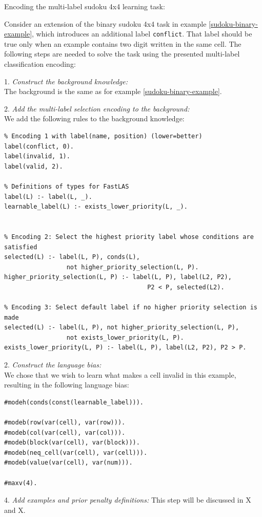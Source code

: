 \begin{example}
Encoding the multi-label sudoku 4x4 learning task:

Consider an extension of the binary sudoku 4x4 task in example \ref{sudoku-binary-example}, which introduces an additional label \verb_conflict_. 
That label should be true only when an example contains two digit written in the same cell.
The following steps are needed to solve the task using the presented multi-label classification encoding:

1. \textit{Construct the background knowledge:} \\
The background is the same as for example \ref{sudoku-binary-example}.

2. \textit{Add the multi-label selection encoding to the background:} \\
We add the following rules to the background knowledge:
\begin{lstlisting}
% Encoding 1 with label(name, position) (lower=better)
label(conflict, 0).
label(invalid, 1).
label(valid, 2).

% Definitions of types for FastLAS
label(L) :- label(L, _).
learnable_label(L) :- exists_lower_priority(L, _).


% Encoding 2: Select the highest priority label whose conditions are satisfied
selected(L) :- label(L, P), conds(L), 
                 not higher_priority_selection(L, P).
higher_priority_selection(L, P) :- label(L, P), label(L2, P2), 
                                       P2 < P, selected(L2).

% Encoding 3: Select default label if no higher priority selection is made
selected(L) :- label(L, P), not higher_priority_selection(L, P), 
                 not exists_lower_priority(L, P).
exists_lower_priority(L, P) :- label(L, P), label(L2, P2), P2 > P.
\end{lstlisting}

2. \textit{Construct the language bias:} \\
We chose that we wish to learn what makes a cell invalid in this example, resulting in the following language bias:
\begin{verbatim}
#modeh(conds(const(learnable_label))).

#modeb(row(var(cell), var(row))).
#modeb(col(var(cell), var(col))).
#modeb(block(var(cell), var(block))).
#modeb(neq_cell(var(cell), var(cell))).
#modeb(value(var(cell), var(num))).

#maxv(4).
\end{verbatim}

4. \textit{Add examples and prior penalty definitions:}
This step will be discussed in X and X.
\end{example}


